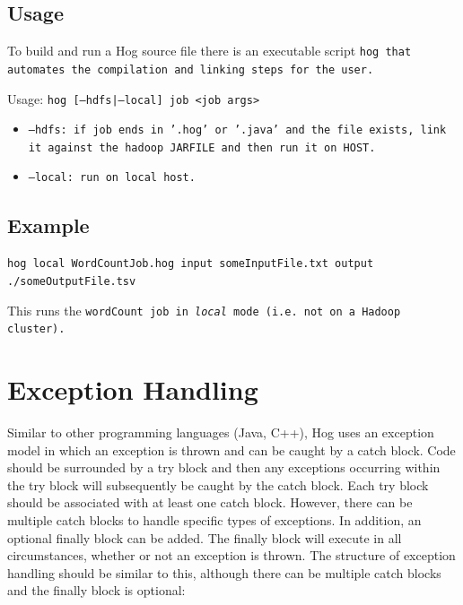 \documentclass{article}
\begin{document}
\subsection{Usage} %
\label{sub:usage}


To build and run a Hog source file there is an executable script \tt hog
\rm that automates the compilation and linking steps for the user.

Usage: \tt hog [--hdfs|--local] job <job args> \rm
\begin{itemize}
  \item[] \tt --hdfs\rm: if job ends in '.hog' or '.java' and the file exists, link it against the hadoop JARFILE and then run it on HOST.
  \item[] \tt --local\rm: run on local host.
\end{itemize}

\subsection{Example} %
\label{sub:example}

\tt hog ­­local WordCountJob.hog ­­input someInputFile.txt ­­output
./someOutputFile.tsv \rm

This runs the \tt wordCount \rm job in \emph{local} mode (i.e. not on a Hadoop
cluster).



\section{Exception Handling} %
\label{sec:exception_handling}

Similar to other programming languages (Java, C++), Hog uses an exception model in
which an exception is thrown and can be caught by a catch block. Code should be
surrounded by a try block and then any exceptions occurring within the try block
will subsequently be caught by the catch block. Each try block should be
associated with at least one catch block. However, there can be multiple catch
blocks to handle specific types of exceptions. In addition, an optional finally
block can be added. The finally block will execute in all circumstances, whether
or not an exception is thrown. The structure of exception handling should be
similar to this, although there can be multiple catch blocks and the finally block
is optional:
\end{document}
